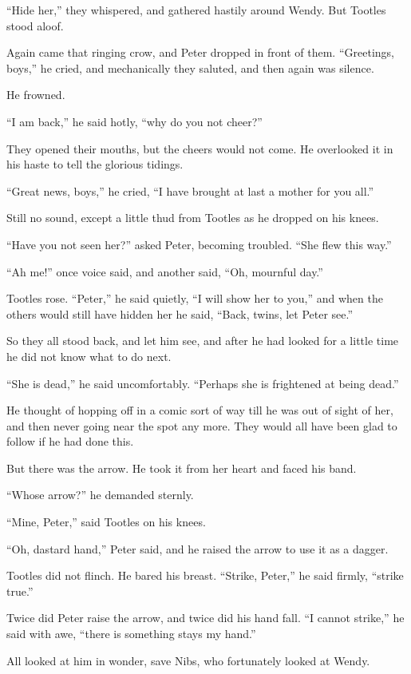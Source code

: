 “Hide her,” they whispered, and gathered hastily around Wendy.
But Tootles stood aloof.

Again came that ringing crow, and Peter dropped in front of them.
“Greetings, boys,” he cried, and mechanically they saluted, and then again was silence.

He frowned.

“I am back,” he said hotly, “why do you not cheer?”

They opened their mouths, but the cheers would not come.
He overlooked it in his haste to tell the glorious tidings.

“Great news, boys,” he cried, “I have brought at last a mother for you all.”

Still no sound, except a little thud from Tootles as he dropped on his knees.

“Have you not seen her?\@” asked Peter, becoming troubled.
“She flew this way.”

“Ah me!\@” once voice said, and another said, “Oh, mournful day.”

Tootles rose.
“Peter,” he said quietly, “I will show her to you,”
and when the others would still have hidden her he said, “Back, twins, let Peter see.”

So they all stood back, and let him see,
and after he had looked for a little time he did not know what to do next.

“She is dead,” he said uncomfortably.
“Perhaps she is frightened at being dead.”

He thought of hopping off in a comic sort of way till he was out of sight of her,
and then never going near the spot any more.
They would all have been glad to follow if he had done this.

But there was the arrow.
He took it from her heart and faced his band.

“Whose arrow?\@” he demanded sternly.

“Mine, Peter,” said Tootles on his knees.

“Oh, dastard hand,” Peter said, and he raised the arrow to use it as a dagger.

Tootles did not flinch.
He bared his breast.
“Strike, Peter,” he said firmly, “strike true.”

Twice did Peter raise the arrow, and twice did his hand fall.
“I cannot strike,” he said with awe, “there is something stays my hand.”

All looked at him in wonder, save Nibs, who fortunately looked at Wendy.

